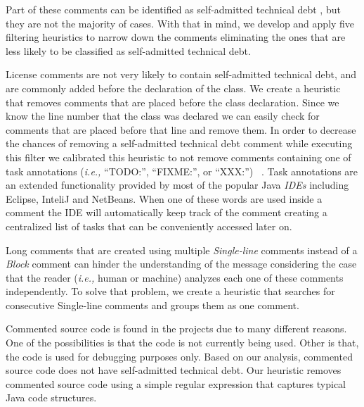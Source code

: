 Part of these comments can be identified as self-admitted technical debt \cite{Potdar2014ICSME},  but they are not the majority of cases. With that in mind, we develop and apply five filtering heuristics  to narrow down the comments eliminating the ones that are less likely to be classified as self-admitted technical debt. 

License comments are not very likely to contain self-admitted technical debt, and are commonly added before the declaration of the class. We create a heuristic that removes comments that are placed before the class declaration. Since we know the line number that the class was declared we can easily check for comments that are placed before that line and remove them. In order to decrease the chances of removing a self-admitted technical debt comment while executing this filter we calibrated this heuristic to not remove comments containing one of task annotations (\textit{i.e.,} ``TODO:'', ``FIXME:'', or ``XXX:'') ~\cite{Storey2008ICSE}. Task annotations are an extended functionality provided by most of the popular Java \textit{IDEs} including Eclipse, InteliJ and NetBeans. When one of these words are used inside a comment the IDE will automatically keep track of the comment creating a centralized list of tasks that can be conveniently accessed later on. 

Long comments that are created using multiple \emph{Single-line} comments instead of a \emph{Block} comment can hinder the understanding of the message considering the case that the reader (\textit{i.e.,} human or machine) analyzes each one of these comments independently. To solve that problem, we create a heuristic that searches for consecutive Single-line comments and groups them as one comment.
 
Commented source code is found in the projects due to many different reasons. One of the possibilities is that the code is not currently being used. Other is that, the code is used for debugging purposes only. Based on our analysis, commented source code does not have self-admitted technical debt. Our heuristic removes commented source code using a simple regular expression that captures typical Java code structures.


